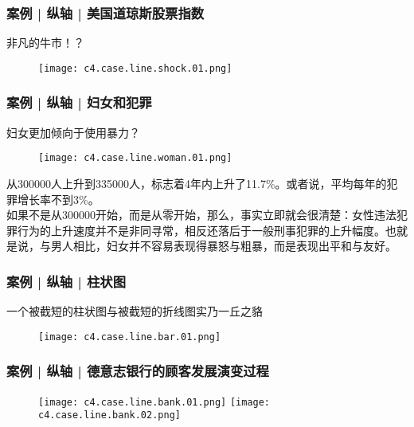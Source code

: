 \begin{frame}
  \frametitle{案例 | 纵轴 | 美国道琼斯股票指数}
  \begin{block}{非凡的牛市！？}
    \begin{figure}
      \centering
      \texttt{[image: c4.case.line.shock.01.png]}
    \end{figure}
  \end{block}
\end{frame}

\begin{frame}
  \frametitle{案例 | 纵轴 | 妇女和犯罪}
  \begin{block}{妇女更加倾向于使用暴力？}
    \begin{figure}
      \centering
      \texttt{[image: c4.case.line.woman.01.png]}
    \end{figure}
    \vspace{-1em}
    \pause
    从300000人上升到335000人，标志着4年内上升了11.7\%。或者说，平均每年的犯罪增长率不到3\%。\\
    \vspace{0.2em}
如果不是从300000开始，而是从零开始，那么，事实立即就会很清楚：女性违法犯罪行为的上升速度并不是非同寻常，相反还落后于一般刑事犯罪的上升幅度。也就是说，与男人相比，妇女并不容易表现得暴怒与粗暴，而是表现出平和与友好。
  \end{block}
\end{frame}

\begin{frame}
  \frametitle{案例 | 纵轴 | 柱状图}
  \begin{block}{一个被截短的柱状图与被截短的折线图实乃一丘之貉}
  \begin{figure}
    \centering
    \texttt{[image: c4.case.line.bar.01.png]}
  \end{figure}
  \end{block}
\end{frame}

\begin{frame}
  \frametitle{案例 | 纵轴 | 德意志银行的顾客发展演变过程}
  \begin{figure}
    \centering
    \texttt{[image: c4.case.line.bank.01.png]}\quad
    \texttt{[image: c4.case.line.bank.02.png]}
  \end{figure}
\end{frame}

